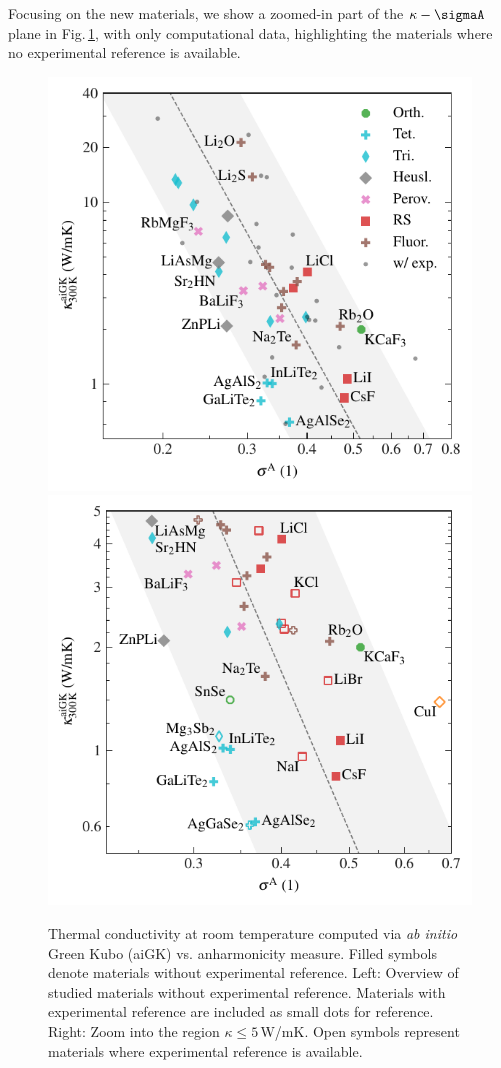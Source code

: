 Focusing on the new materials, we show a zoomed-in part of the $\kappa-\sigmaA$ plane in Fig.\,\ref{fig:kappa_sigma}, with only computational data, highlighting the materials where no experimental reference is available.
%
\begin{figure}
	\includegraphics[width=.49\textwidth]{./data/plots/kappa_vs_sigma_trusted/kappa_vs_sigma_trusted.pdf}
	\hfill
	\includegraphics[width=.49\textwidth]{./data/plots/kappa_vs_sigma_trusted/kappa_vs_sigma_trusted_experiment_zoom.pdf}
	\caption{
	Thermal conductivity at room temperature computed via \emph{ab initio} Green Kubo (aiGK) vs. anharmonicity measure. Filled symbols denote materials without experimental reference. Left: Overview of studied materials without experimental reference. Materials with experimental reference are included as small dots for reference. Right: Zoom into the region $\kappa \leq 5$\,W/mK. Open symbols represent materials where experimental reference is available.}
	\label{fig:kappa_sigma}
\end{figure}
%
